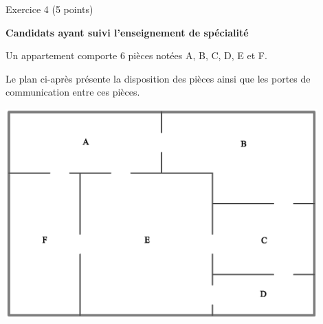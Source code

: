 
%
\begin{h2}Exercice 4 (5 points)\end{h2}
\par
\textbf{Candidats ayant suivi l'enseignement de spécialité}
\par
Un appartement comporte 6 pièces notées A, B, C, D, E et F.
\par
Le plan ci-après présente la disposition des pièces ainsi que les portes de communication entre ces pièces.
\par
\begin{center}
     \begin{extern}%
          \includegraphics[width=0.9\textwidth]{images/BBESL-spe-1-1}%
     \end{extern}
\end{center}

